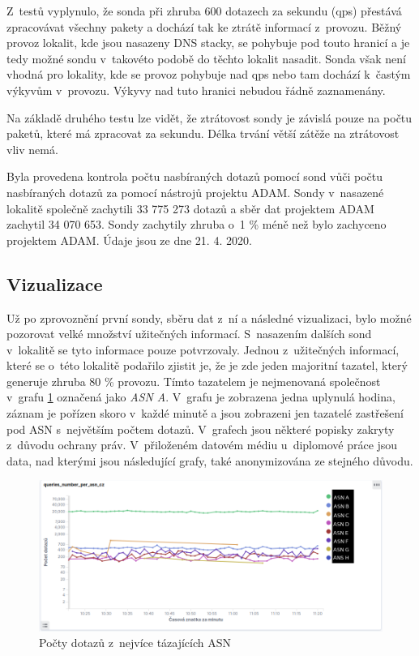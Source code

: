 \documentclass[thesis=M,czech]{src/FITthesis}[2019/12/23]
\begin{document}
Z~testů vyplynulo, že sonda při zhruba 600 dotazech za sekundu (qps) přestává zpracovávat všechny pakety a dochází tak ke ztrátě informací z~provozu. Běžný provoz lokalit, kde jsou nasazeny DNS stacky, se pohybuje pod touto hranicí a je tedy možné sondu v~takovéto podobě do těchto lokalit nasadit. Sonda však není vhodná pro lokality, kde se provoz pohybuje nad  qps nebo tam dochází k~častým výkyvům v~provozu. Výkyvy nad tuto hranici nebudou řádně zaznamenány. 

Na základě druhého testu lze vidět, že ztrátovost sondy je závislá pouze na počtu paketů, které má zpracovat za sekundu. Délka trvání větší zátěže na ztrátovost vliv nemá. 

Byla provedena kontrola počtu nasbíraných dotazů pomocí sond vůči počtu nasbíraných dotazů za pomocí nástrojů projektu ADAM. Sondy v~nasazené lokalitě společně zachytili 33 775 273 dotazů a sběr dat projektem ADAM zachytil 34 070 653. Sondy zachytily zhruba o~1 \% méně než bylo zachyceno projektem ADAM. Údaje jsou ze dne 21. 4. 2020.

 
\subsection{Vizualizace}
\label{sec:visiulisation}
Už po zprovoznění první sondy, sběru dat z~ní a následné vizualizaci, bylo možné pozorovat velké množství užitečných informací. S~nasazením dalších sond v~lokalitě se tyto informace pouze potvrzovaly. Jednou z~užitečných informací, které  se o~této lokalitě podařilo zjistit je, že je zde jeden majoritní tazatel, který generuje zhruba 80 \% provozu. Tímto tazatelem je nejmenovaná společnost v~grafu \ref{fig:queries-per-asn} označená jako \textit{ASN A}. V~grafu je zobrazena jedna uplynulá hodina, záznam je pořízen skoro v~každé minutě a jsou zobrazeni jen tazatelé zastřešení pod ASN s~největším počtem dotazů. V~grafech jsou některé popisky zakryty z~důvodu ochrany práv. V~přiloženém datovém médiu u~diplomové práce jsou data, nad kterými jsou následující grafy, také anonymizována ze stejného důvodu.
\begin{figure}[ht]
  \centering
   \includegraphics[width=1\textwidth]{images/queries-per-asn.png}
   \caption{Počty dotazů z~nejvíce tázajících ASN}
     \label{fig:queries-per-asn}
\end{figure}
\end{document}
